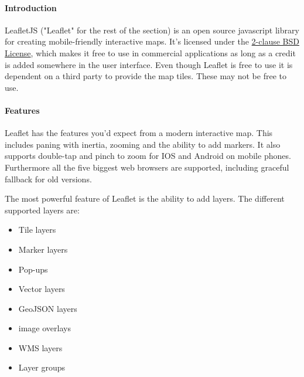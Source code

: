 \documentclass[11pt,a4paper,titlepage,oneside]{report}
\begin{document}
    \paragraph{Introduction} \indent
    LeafletJS ("Leaflet" for the rest of the section) is an open source javascript library for creating mobile-friendly interactive maps. It's licensed under the \href{'https://github.com/Leaflet/Leaflet/blob/master/LICENSE'}{2-clause BSD License}, which makes it free to use in commercial applications as long as a credit is added somewhere in the user interface.
    Even though Leaflet is free to use it is dependent on a third party to provide the map tiles. These may not be free to use.

    \paragraph{Features}
    Leaflet has the features you'd expect from a modern interactive map. This includes paning with inertia, zooming and the ability to add markers. It also supports double-tap and pinch to zoom for IOS and Android on mobile phones. Furthermore all the five biggest web browsers are supported, including graceful fallback for old versions.
    
    The most powerful feature of Leaflet is the ability to add layers. The different supported layers are:

    \begin{itemize}
      \item Tile layers
      \item Marker layers
      \item Pop-ups
      \item Vector layers
      \item GeoJSON layers
      \item image overlays
      \item WMS layers
      \item Layer groups
    \end{itemize}
\end{document}
